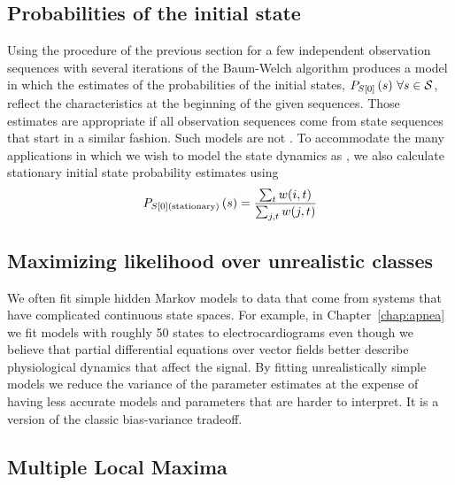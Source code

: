 \subsection{Probabilities of the initial state}
\label{sec:Ps0}

Using the procedure of the previous section for a few independent
observation sequences with several iterations of the Baum-Welch
algorithm produces a model in which the estimates of the probabilities
of the initial states, $P_{\ti{S}{0}} \left(s \right)\,\forall s \in
\states$, reflect the characteristics at the beginning of the given
sequences.  Those estimates are appropriate if all observation
sequences come from state sequences that start in a similar fashion.
Such models are not .  To accommodate the many
applications in which we wish to model the state dynamics as
, we also calculate stationary initial state probability
estimates using
\begin{equation}
  \label{eq:Ps0stationary}
  P_{{S}{[0]}(\text{stationary})} \left(s \right) =
  \frac{\sum_{t}w(i,t)}{\sum_{j,t}w(j,t)}
\end{equation}



\subsection{Maximizing likelihood over unrealistic classes}
\label{sec:incredible}

We often fit simple hidden Markov models to data that come from
systems that have complicated continuous state spaces.  For example,
in Chapter~\ref{chap:apnea} we fit models with roughly 50 states to
electrocardiograms even though we believe that partial differential
equations over vector fields better describe physiological dynamics
that affect the signal.  By fitting unrealistically simple models we
reduce the variance of the parameter estimates at the expense of
having less accurate models and parameters that are harder to
interpret.  It is a version of the classic  bias-variance tradeoff.

\subsection{Multiple Local Maxima}
\label{sec:MultiMax}

